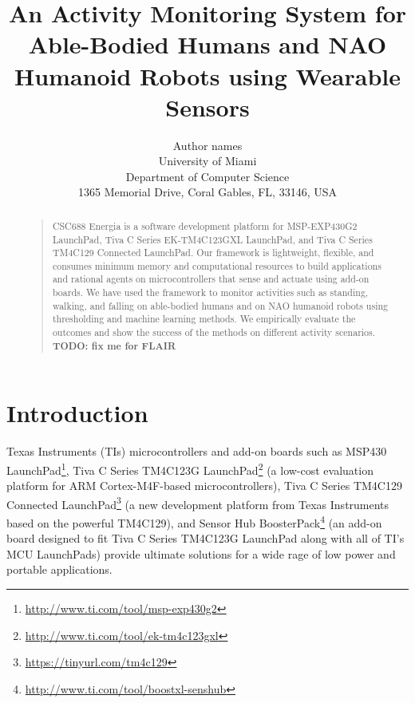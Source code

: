 \documentclass[letterpaper]{article}
\begin{document}
%
\title{An Activity Monitoring System for Able-Bodied Humans and NAO Humanoid Robots using Wearable 
Sensors}
\author{Author names \\ %
University of Miami \\
Department of Computer Science\\
1365 Memorial Drive, Coral Gables, FL, 33146, USA\\
}
\maketitle
\begin{abstract}
\begin{quote}
CSC688 Energia is a software development platform for MSP-EXP430G2 LaunchPad, Tiva C Series
EK-TM4C123GXL LaunchPad, and Tiva C Series TM4C129 Connected LaunchPad. Our framework is
lightweight, flexible, and consumes minimum memory and computational resources to build
applications and rational agents on microcontrollers that sense and actuate using add-on boards. We
have used the framework to monitor activities such as standing, walking, and falling on able-bodied
humans and on NAO humanoid robots using thresholding and machine learning methods. We empirically
evaluate the outcomes and show the success of the methods on different activity scenarios. 
\textbf{TODO: fix me for FLAIR}
\end{quote}
\end{abstract}

\section{Introduction}

Texas Instruments (TIs) microcontrollers and add-on boards such as MSP430{\texttrademark}
LaunchPad\footnote{\url{http://www.ti.com/tool/msp-exp430g2}},
Tiva{\texttrademark} C Series TM4C123G
LaunchPad\footnote{\url{http://www.ti.com/tool/ek-tm4c123gxl}} (a low-cost evaluation platform for
ARM
Cortex-M4F-based microcontrollers), Tiva C Series TM4C129 Connected
LaunchPad\footnote{\url{https://tinyurl.com/tm4c129}} (a new
development platform from Texas Instruments
based on the powerful TM4C129), and Sensor
Hub BoosterPack\footnote{\url{http://www.ti.com/tool/boostxl-senshub}} (an add-on board designed to
fit Tiva C Series TM4C123G LaunchPad
along with all of TI’s MCU LaunchPads) provide ultimate solutions
for a wide rage of low power and portable applications.
\end{document}
